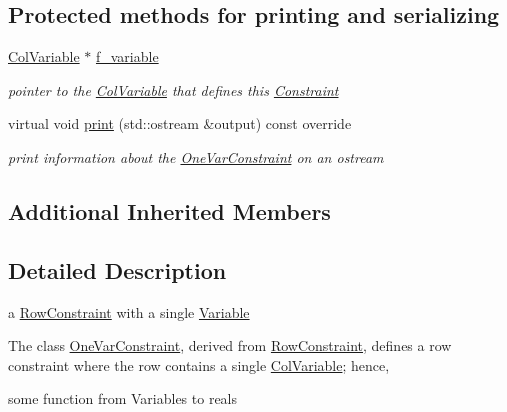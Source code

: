 \subsection*{Protected methods for printing and serializing}
\begin{DoxyCompactItemize}
\item 
\mbox{\label{class_s_m_spp__di__unipi__it_1_1_one_var_constraint_ac3ae2906ef0851cd21804a657be46ff1}} 
\mbox{\hyperlink{class_s_m_spp__di__unipi__it_1_1_col_variable}{Col\+Variable}} $\ast$ \mbox{\hyperlink{class_s_m_spp__di__unipi__it_1_1_one_var_constraint_ac3ae2906ef0851cd21804a657be46ff1}{f\+\_\+variable}}
\begin{DoxyCompactList}\small\item\em pointer to the \mbox{\hyperlink{class_s_m_spp__di__unipi__it_1_1_col_variable}{Col\+Variable}} that defines this \mbox{\hyperlink{class_s_m_spp__di__unipi__it_1_1_constraint}{Constraint}} \end{DoxyCompactList}\item 
\mbox{\label{class_s_m_spp__di__unipi__it_1_1_one_var_constraint_a59a9fcbf8f9f86d348344b2073644b0e}} 
virtual void \mbox{\hyperlink{class_s_m_spp__di__unipi__it_1_1_one_var_constraint_a59a9fcbf8f9f86d348344b2073644b0e}{print}} (std\+::ostream \&output) const override
\begin{DoxyCompactList}\small\item\em print information about the \mbox{\hyperlink{class_s_m_spp__di__unipi__it_1_1_one_var_constraint}{One\+Var\+Constraint}} on an ostream \end{DoxyCompactList}\end{DoxyCompactItemize}
\subsection*{Additional Inherited Members}


\subsection{Detailed Description}
a \mbox{\hyperlink{class_s_m_spp__di__unipi__it_1_1_row_constraint}{Row\+Constraint}} with a single \mbox{\hyperlink{class_s_m_spp__di__unipi__it_1_1_variable}{Variable}} 

The class \mbox{\hyperlink{class_s_m_spp__di__unipi__it_1_1_one_var_constraint}{One\+Var\+Constraint}}, derived from \mbox{\hyperlink{class_s_m_spp__di__unipi__it_1_1_row_constraint}{Row\+Constraint}}, defines a row constraint where the row contains a single \mbox{\hyperlink{class_s_m_spp__di__unipi__it_1_1_col_variable}{Col\+Variable}}; hence, \begin{DoxyVerb}       some function from Variables to reals
\end{DoxyVerb}



